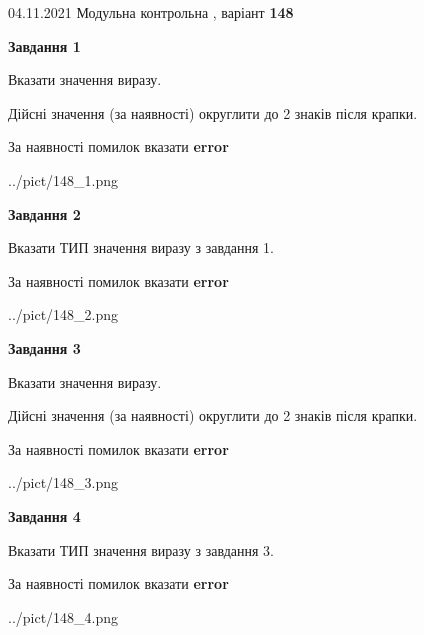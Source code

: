 \documentclass[11pt, ukrainian]{article}
\begin{document}
{04.11.2021 Модульна контрольна , варіант  \No \textbf { 148 }\par}
{
\begin {large}
{\begin {center}\textbf{Завдання 1}\end {center}}\par
Вказати значення виразу. \par
Дійсні значення (за наявності) округлити до 2 знаків після крапки. \par
За наявності помилок вказати \textbf{error}

\begin{center}
	{../pict/148_1.png}
\end{center}
\newpage

{\begin {center}\textbf{Завдання 2}\end {center}}\par
Вказати ТИП значення виразу з завдання 1. \par
За наявності помилок вказати \textbf{error}

\begin{center}
	{../pict/148_2.png}
\end{center}
\newpage

{\begin {center}\textbf{Завдання 3}\end {center}}\par
Вказати значення виразу. \par
Дійсні значення (за наявності) округлити до 2 знаків після крапки. \par
За наявності помилок вказати \textbf{error}

\begin{center}
	{../pict/148_3.png}
\end{center}
\newpage

{\begin {center}\textbf{Завдання 4}\end {center}}\par
Вказати ТИП значення виразу з завдання 3. \par
За наявності помилок вказати \textbf{error}

\begin{center}
	{../pict/148_4.png}
\end{center}
\newpage


\end{large}}
\end{document}

